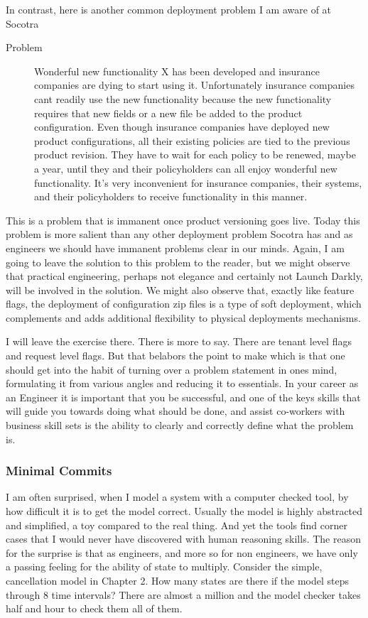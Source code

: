 In contrast, here is another common deployment problem I am aware of at Socotra
\begin{description}
  \item[Problem] Wonderful new functionality X has been developed and insurance companies are dying to start using it. Unfortunately insurance companies
  cant readily use the new functionality because the new functionality requires that new fields or a new file be added to the product configuration. Even
  though insurance companies have deployed new product configurations, all their existing policies are tied to the previous product revision. They have to wait for each
  policy to be renewed, maybe a year, until they and their policyholders can all enjoy wonderful new functionality. It's very inconvenient for insurance
  companies, their systems, and their policyholders to receive functionality in this manner.
\end{description}
This is a problem that is immanent once product versioning goes live. Today this problem  is more salient than any other deployment problem Socotra
has and as engineers we should have immanent problems clear in our minds. Again, I am going to leave the solution to this problem to the reader,
but we might observe that practical engineering, perhaps not elegance and certainly not Launch Darkly, will be involved in the solution. We might also observe
that, exactly like feature flags, the deployment of configuration zip files is a type of soft deployment, which complements and adds additional
flexibility to physical deployments mechanisms.

I will leave the exercise there. There is more to say. There are tenant level flags and request level flags. But that belabors the point to make
which is that
one should get into the habit of turning over a problem statement in ones mind, formulating it from various angles and reducing it to
essentials. In your career as an Engineer it is important that you be successful, and one of the keys skills that will guide you towards doing what should
be done, and assist co-workers with business skill sets is the ability to clearly and correctly define what the problem is.


\subsubsection{Minimal Commits}
I am often surprised, when I model a system with a computer checked tool, by how difficult it is to get the model correct. Usually the model
is highly abstracted and simplified, a toy compared to the real thing. And yet the tools find corner cases that I would never have discovered with
human reasoning skills. The reason for the surprise is that as engineers, and more so for non engineers, we have only a passing feeling for the
ability of state to multiply. Consider the simple, cancellation model in Chapter 2. How many states are there if the model steps through 8 time intervals?
There are almost a million and the model checker takes half and hour to check them all of them.

